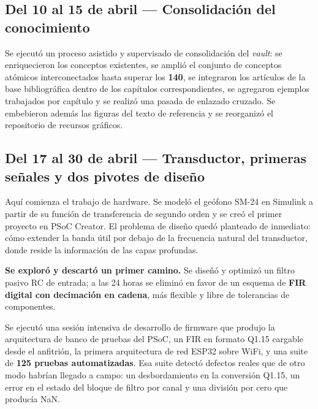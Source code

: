\subsection{Del 10 al 15 de abril --- Consolidaci\'on del conocimiento}

Se ejecut\'o un proceso asistido y supervisado de consolidaci\'on del \emph{vault}: se
enriquecieron los conceptos existentes, se ampli\'o el conjunto de conceptos at\'omicos
interconectados hasta superar los \textbf{140}, se integraron los art\'iculos de la base
bibliogr\'afica dentro de los cap\'itulos correspondientes, se agregaron ejemplos trabajados
por cap\'itulo y se realiz\'o una pasada de enlazado cruzado. Se embebieron adem\'as las
figuras del texto de referencia y se reorganiz\'o el repositorio de recursos gr\'aficos.


\subsection{Del 17 al 30 de abril --- Transductor, primeras se\~nales y dos pivotes de dise\~no}

Aqu\'i comienza el trabajo de hardware. Se model\'o el ge\'ofono SM-24 en Simulink a partir
de su funci\'on de transferencia de segundo orden y se cre\'o el primer proyecto en PSoC
Creator. El problema de dise\~no qued\'o planteado de inmediato: c\'omo extender la banda
\'util por debajo de la frecuencia natural del transductor, donde reside la informaci\'on de
las capas profundas.

\textbf{Se explor\'o y descart\'o un primer camino.} Se dise\~n\'o y optimiz\'o un filtro pasivo
RC de entrada; a las 24 horas se elimin\'o en favor de un esquema de \textbf{FIR digital
con decimaci\'on en cadena}, m\'as flexible y libre de tolerancias de componentes.

Se ejecut\'o una sesi\'on intensiva de desarrollo de firmware que produjo la arquitectura de
banco de pruebas del PSoC, un FIR en formato Q1.15 cargable desde el anfitri\'on, la
primera arquitectura de red ESP32 sobre WiFi, y una suite de \textbf{125 pruebas
automatizadas}. Esa suite detect\'o defectos reales que de otro modo habr\'ian llegado a
campo: un desbordamiento en la conversi\'on Q1.15, un error en el estado del bloque de
filtro por canal y una divisi\'on por cero que produc\'ia NaN.

